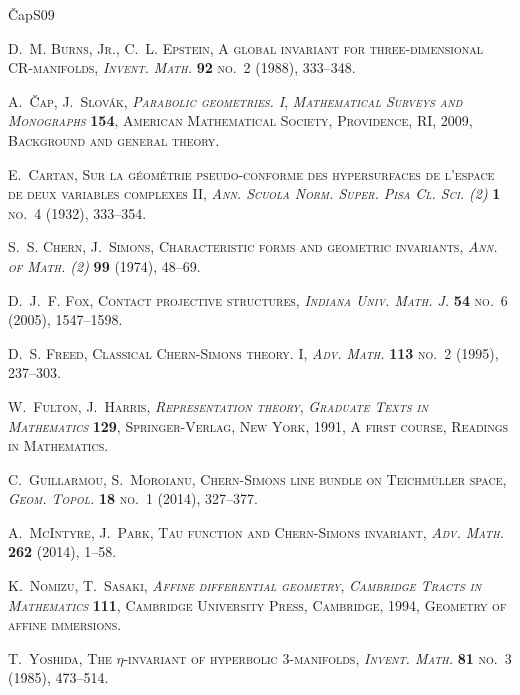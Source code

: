 \documentclass[british,11pt,a4paper]{amsart}
\numberwithin{equation}{section}
\numberwithin{theorem}{section}
\theoremstyle{definition}
\theoremstyle{remark}
\begin{document}
\begin{thebibliography}{{\v {C}ap}S09}

\bgroup\scshape{}D.~M. Burns, Jr.\egroup{}, \bgroup\scshape{}C.~L.
  Epstein\egroup{}, A global invariant for three-dimensional {CR}-manifolds,
  \emph{Invent. Math.} \textbf{92} no.~2 (1988), 333--348.

\bgroup\scshape{}A.~{\v {C}ap}\egroup{},
  \bgroup\scshape{}J.~Slov{\'a}k\egroup{}, \emph{Parabolic geometries. I},
  \emph{Mathematical Surveys and Monographs} \textbf{154}, American
  Mathematical Society, Providence, RI, 2009, Background and general theory.

\bgroup\scshape{}E.~Cartan\egroup{}, Sur la g\'eom\'etrie pseudo-conforme des
  hypersurfaces de l'espace de deux variables complexes {II},  \emph{Ann.
  Scuola Norm. Super. Pisa Cl. Sci. (2)} \textbf{1} no.~4 (1932), 333--354.

\bgroup\scshape{}S.~S. Chern\egroup{}, \bgroup\scshape{}J.~Simons\egroup{},
  Characteristic forms and geometric invariants,  \emph{Ann. of Math. (2)}
  \textbf{99} (1974), 48--69.

\bgroup\scshape{}D.~J.~F. Fox\egroup{}, Contact projective structures,
  \emph{Indiana Univ. Math. J.} \textbf{54} no.~6 (2005), 1547--1598.

\bgroup\scshape{}D.~S. Freed\egroup{}, Classical {C}hern-{S}imons theory. {I},
  \emph{Adv. Math.} \textbf{113} no.~2 (1995), 237--303.

\bgroup\scshape{}W.~Fulton\egroup{}, \bgroup\scshape{}J.~Harris\egroup{},
  \emph{Representation theory}, \emph{Graduate Texts in Mathematics}
  \textbf{129}, Springer-Verlag, New York, 1991, A first course, Readings in
  Mathematics.

\bgroup\scshape{}C.~Guillarmou\egroup{}, \bgroup\scshape{}S.~Moroianu\egroup{},
  Chern-{S}imons line bundle on {T}eichm\"uller space,  \emph{Geom. Topol.}
  \textbf{18} no.~1 (2014), 327--377.

\bgroup\scshape{}A.~McIntyre\egroup{}, \bgroup\scshape{}J.~Park\egroup{}, Tau
  function and {C}hern-{S}imons invariant,  \emph{Adv. Math.} \textbf{262}
  (2014), 1--58.

\bgroup\scshape{}K.~Nomizu\egroup{}, \bgroup\scshape{}T.~Sasaki\egroup{},
  \emph{Affine differential geometry}, \emph{Cambridge Tracts in Mathematics}
  \textbf{111}, Cambridge University Press, Cambridge, 1994, Geometry of affine
  immersions.

\bgroup\scshape{}T.~Yoshida\egroup{}, The {$\eta$}-invariant of hyperbolic
  {$3$}-manifolds,  \emph{Invent. Math.} \textbf{81} no.~3 (1985), 473--514.

\end{thebibliography}
\end{document}
